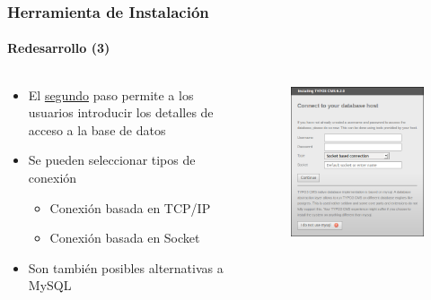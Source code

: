 
\begin{frame}[fragile]
	\frametitle{Herramienta de Instalación}
	\framesubtitle{Redesarrollo (3)}

	\begin{columns}[T]

		\begin{column}{.5\textwidth}
			\begin{itemize}
				\item El \underline{segundo} paso permite a los usuarios introducir los detalles de acceso a la base de datos
				\item Se pueden seleccionar tipos de conexión
					\begin{itemize}
						\item Conexión basada en TCP/IP
						\item Conexión basada en Socket
					\end{itemize}
				\item Son también posibles alternativas a MySQL
			\end{itemize}
		\end{column}

		\begin{column}{.5\textwidth}
			\begin{figure}\vspace*{-0.4cm}
				\includegraphics[width=0.8\linewidth]{Images/InstallTool/DatabaseConnectionDetails.png}
			\end{figure}
		\end{column}

	\end{columns}

\end{frame}

